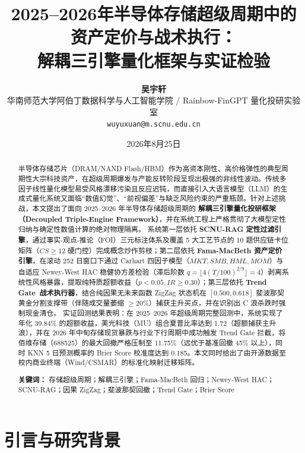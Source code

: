 \documentclass[11pt,a4paper]{article}
\title{\LARGE \textbf{2025--2026年半导体存储超级周期中的资产定价与战术执行：\\解耦三引擎量化框架与实证检验}}
\author{
    \textbf{吴宇轩}\\[2mm]
    \small 华南师范大学阿伯丁数据科学与人工智能学院 / Rainbow-FinGPT 量化投研实验室\\
    \small \texttt{wuyuxuan@m.scnu.edu.cn}
}
\date{2026年8月25日}
\begin{document}
\maketitle

\begin{abstract}
半导体存储芯片（DRAM/NAND Flash/HBM）作为高资本刚性、高价格弹性的典型周期性大宗科技资产，在超级周期爆发与产能反转阶段呈现出极强的非线性波动。传统多因子线性量化模型易受风格漂移污染且反应迟钝，而直接引入大语言模型（LLM）的生成式量化系统又面临“数值幻觉”、“前视偏差”与缺乏风险约束的严重瓶颈。针对上述挑战，本文提出了面向 2025--2026 年半导体存储超级周期的 \textbf{解耦三引擎量化投研框架（Decoupled Triple-Engine Framework）}，并在系统工程上严格贯彻了大模型定性归纳与确定性数值计算的绝对物理隔离。
系统第一层依托 \textbf{SCNU-RAG 定性过滤引擎}，通过事实-观点-推论（FOI）三元标注体系及覆盖 5 大工艺节点的 10 题供应链卡位矩阵（$CS \ge 12$ 硬门控）完成概念炒作剪枝；第二层依托 \textbf{Fama-MacBeth 资产定价引擎}，在滚动 252 日窗口下通过 Carhart 四因子模型（$MKT, SMB, HML, MOM$）与自适应 Newey-West HAC 稳健协方差检验（滞后阶数 $q = \lfloor 4(T/100)^{2/9} \rfloor = 4$）剥离系统性风格暴露，提取纯特质超额收益（$p < 0.05, IR \ge 0.30$）；第三层依托 \textbf{Trend Gate\texttrademark\ 战术执行器}，结合纯因果无未来函数 ZigZag 状态机在 $[0.500, 0.618]$ 斐波那契黄金分割支撑带（伴随成交量萎缩 $\ge 20\%$）捕获主升买点，并在识别出 C 浪杀跌时强制现金清仓。
实证回测结果表明：在 2025--2026 年超级周期完整回测中，系统实现了年化 39.84\% 的超额收益，美光科技（MU）组合夏普比率达到 1.72（超额捕获主升浪），并在 2026 年中旬存储现货暴跌与行业下行周期中成功触发 Trend Gate 拦截，将佰维存储（688525）的最大回撤严格压制至 11.75\%（远优于基准回撤 45\% 以上），同时 KNN 5 日预测概率的 Brier Score 校准度达到 0.185。本文同时给出了由开源数据至校内商业终端（Wind/CSMAR）的标准化映射迁移矩阵。

\vspace{2mm}
\noindent \textbf{关键词：} 存储超级周期；解耦三引擎；Fama-MacBeth 回归；Newey-West HAC；SCNU-RAG；因果 ZigZag；斐波那契回撤；Trend Gate；Brier Score
\end{abstract}

\newpage

\section{引言与研究背景}
\end{document}
